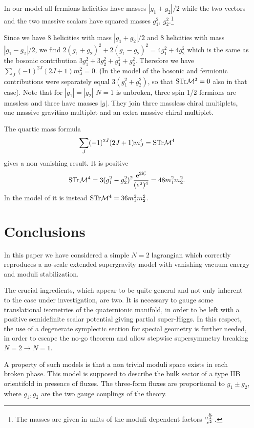 \documentclass[a4paper,12pt]{article}
\begin{document}
In our model all fermions helicities have masses $|g_1 \pm g_2|/2$ while the two vectors and the two massive scalars have squared 
masses $g_1^2$, $g_2^2$.\footnote{The masses are given in units of the moduli dependent factors
$\frac
{
{\rm e}^
{\frac{\mathcal K}2}}{e^2}$.}

Since we have 8 helicities with mass $|g_1 + g_2|/2$ and 8 helicities with mass $|g_1 - g_2|/2$, we find
$
2(g_1+g_2)^2 + 2(g_1-g_2)^2 = 4 g_1^2+4g_2^2
$
which is the same as the bosonic contribution $3g_1^2 +3g_2^2 +g_1^2+g_2^2$.
Therefore we have $\sum_J (-1)^{2J} (2J+1)m_J^2 =0$.
(In the model of \cite{cgp2} the bosonic and fermionic contributions were separately equal $3(g_1^2 + g_2^2)$,
 so that ${\rm STr}{\mathcal M}^2=0$ also in that case).
Note that for $|g_1|=|g_2|$ $N=1$ is unbroken, three spin 1/2 fermions  are massless and three have masses $|g|$.
They join three massless chiral multiplets, one massive gravitino multiplet and an extra massive chiral multiplet.

The quartic mass formula
\begin{equation}
 \sum_J (-1)^{2J} (2J+1)m_J^4 = {\rm STr} {\mathcal M}^4
\end{equation}
gives a non vanishing result. It is positive 
$${\rm STr} {\mathcal M}^4= 3 (g_1^2-g_2^2)^2\frac{{\rm e}^{2{\mathcal K}}}{(e^2)^4}= 48m_1^2m_2^2.
$$
In the model of \cite{cgp2} it is instead ${\rm STr} {\mathcal M}^4= 36m_1^2m_2^2$.

\section{Conclusions}
In this paper we have considered a simple $N=2$ lagrangian which correctly reproduces a no-scale extended
supergravity model with vanishing vacuum energy and moduli stabilization.

The crucial ingredients, which appear to be quite general and not only inherent to the case under investigation, are two.
It is necessary to gauge some translational isometries of the quaternionic manifold, in order to be left with a positive semidefinite 
scalar potential giving partial super-Higgs. In this respect,
the use of a degenerate symplectic section for special geometry is further needed, in order to escape the no-go theorem and allow stepwise
supersymmetry breaking $N=2\to N=1$.

A property of such models is that a non trivial moduli space exists in each broken phase.
This model is supposed to describe the bulk sector of a type IIB orientifold in presence of fluxes.
The three-form fluxes are proportional to $g_1 \pm g_2$, where $g_1,g_2$ are the two gauge couplings of the theory.
\end{document}
